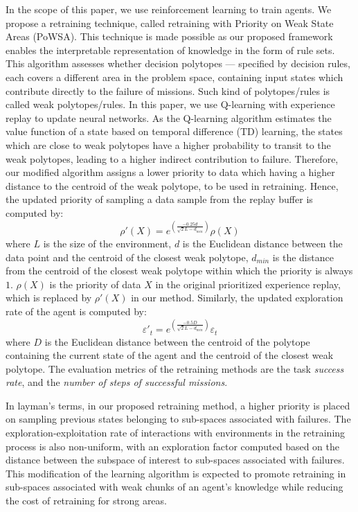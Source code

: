 \documentclass[lettersize,journal]{IEEEtran}
\begin{document}
In the scope of this paper, we use reinforcement learning to train agents. We propose a retraining technique, called retraining with Priority on Weak State Areas (PoWSA). This technique is made possible as our proposed framework enables the interpretable representation of knowledge in the form of rule sets. This algorithm assesses whether decision polytopes — specified by decision rules, each covers a different area in the problem space, containing input states which contribute directly to the failure of missions. Such kind of polytopes/rules is called weak polytopes/rules. In this paper, we use Q-learning with experience replay to update neural networks. As the Q-learning algorithm estimates the value function of a state based on temporal difference (TD) learning, the states which are close to weak polytopes have a higher probability to transit to the weak polytopes, leading to a higher indirect contribution to failure. Therefore, our modified algorithm assigns a lower priority to data which having a higher distance to the centroid of the weak polytope, to be used in retraining. Hence, the updated priority of sampling a data sample from the replay buffer is computed by:
\begin{equation}
\rho '(X) = e^{(\frac{-0.25d}{\sqrt{2}L-d_{min}})}\rho (X)
\end{equation}
where $L$ is the size of the environment, $d$ is the Euclidean distance between the data point and the centroid of the closest weak polytope, $d_{min}$ is the distance from the centroid of the closest weak polytope within which the priority is always $1$. $\rho (X)$ is the priority of data $X$ in the original prioritized experience replay, which is replaced by $\rho '(X)$ in our method. Similarly, the updated exploration rate of the agent is computed by:
\begin{equation}
{\varepsilon '}_t = e^{(\frac{-0.5D}{\sqrt{2}L-d_{min}})}\varepsilon_t
\end{equation}
where $D$ is the Euclidean distance between the centroid of the polytope containing the current state of the agent and the centroid of the closest weak polytope.
The evaluation metrics of the retraining methods are the task \textit{success rate}, and the \textit{number of steps of successful missions}.

In layman\textquoteright s terms, in our proposed retraining method, a higher priority is placed on sampling previous states belonging to sub-spaces associated with failures. The exploration-exploitation rate of interactions with environments in the retraining process is also non-uniform, with an exploration factor computed based on the distance between the subspace of interest to sub-spaces associated with failures. This modification of the learning algorithm is expected to promote retraining in sub-spaces associated with weak chunks of an agent\textquoteright s knowledge while reducing the cost of retraining for strong areas.
\end{document}
